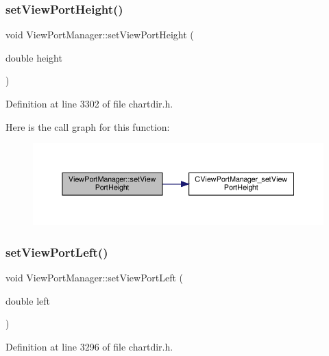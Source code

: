 \subsubsection{\texorpdfstring{set\+View\+Port\+Height()}{setViewPortHeight()}}
{\footnotesize\ttfamily void View\+Port\+Manager\+::set\+View\+Port\+Height (\begin{DoxyParamCaption}\item[{double}]{height }\end{DoxyParamCaption})\hspace{0.3cm}{\ttfamily [inline]}}



Definition at line 3302 of file chartdir.\+h.

Here is the call graph for this function\+:
\nopagebreak
\begin{figure}[H]
\begin{center}
\leavevmode
\includegraphics[width=350pt]{class_view_port_manager_a16729686407f7efaa7bf11e2f912409e_cgraph}
\end{center}
\end{figure}
\mbox{\label{class_view_port_manager_a1270422432f386ab1a0f3c94990c1567}} 
\subsubsection{\texorpdfstring{set\+View\+Port\+Left()}{setViewPortLeft()}}
{\footnotesize\ttfamily void View\+Port\+Manager\+::set\+View\+Port\+Left (\begin{DoxyParamCaption}\item[{double}]{left }\end{DoxyParamCaption})\hspace{0.3cm}{\ttfamily [inline]}}



Definition at line 3296 of file chartdir.\+h.

